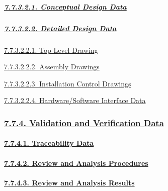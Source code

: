 \documentclass[
]{article}
\begin{document}
\hypertarget{conceptual-design-data}{%
\subparagraph{\texorpdfstring{\protect\hyperlink{conceptual-design-data-1}{7.7.3.2.1.
Conceptual Design
Data}}{7.7.3.2.1. Conceptual Design Data}}\label{conceptual-design-data}}

\hypertarget{detailed-design-data}{%
\subparagraph{\texorpdfstring{\protect\hyperlink{detailed-design-data-1}{7.7.3.2.2.
Detailed Design
Data}}{7.7.3.2.2. Detailed Design Data}}\label{detailed-design-data}}

\protect\hyperlink{top-level-drawing-1}{7.7.3.2.2.1. Top-Level Drawing}

\protect\hyperlink{assembly-drawings-1}{7.7.3.2.2.2. Assembly Drawings}

\protect\hyperlink{installation-control-drawings-1}{7.7.3.2.2.3.
Installation Control Drawings}

\protect\hyperlink{hardwaresoftware-interface-data-1}{7.7.3.2.2.4.
Hardware/Software Interface Data}

\hypertarget{validation-and-verification-data}{%
\subsubsection{\texorpdfstring{\protect\hyperlink{validation-and-verification-data-1}{7.7.4.
Validation and Verification
Data}}{7.7.4. Validation and Verification Data}}\label{validation-and-verification-data}}

\hypertarget{traceability-data}{%
\paragraph{\texorpdfstring{\protect\hyperlink{traceability-data-1}{7.7.4.1.
Traceability
Data}}{7.7.4.1. Traceability Data}}\label{traceability-data}}

\hypertarget{review-and-analysis-procedures}{%
\paragraph{\texorpdfstring{\protect\hyperlink{review-and-analysis-procedures-1}{7.7.4.2.
Review and Analysis
Procedures}}{7.7.4.2. Review and Analysis Procedures}}\label{review-and-analysis-procedures}}

\hypertarget{review-and-analysis-results}{%
\paragraph{\texorpdfstring{\protect\hyperlink{review-and-analysis-results-1}{7.7.4.3.
Review and Analysis
Results}}{7.7.4.3. Review and Analysis Results}}\label{review-and-analysis-results}}
\end{document}
